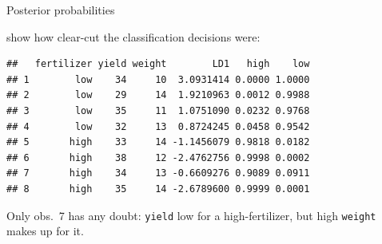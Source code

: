 \begin{frame}[fragile]{Posterior probabilities}
  
  show how clear-cut the classification decisions were:
  
\begin{knitrout}
\color{fgcolor}\begin{kframe}
\begin{alltt}
\hlkwb{=}\hlopt{$}\hlstd{)}
\hlkwb{=}\hlopt{$}
\end{alltt}
\begin{verbatim}
##   fertilizer yield weight        LD1   high    low
## 1        low    34     10  3.0931414 0.0000 1.0000
## 2        low    29     14  1.9210963 0.0012 0.9988
## 3        low    35     11  1.0751090 0.0232 0.9768
## 4        low    32     13  0.8724245 0.0458 0.9542
## 5       high    33     14 -1.1456079 0.9818 0.0182
## 6       high    38     12 -2.4762756 0.9998 0.0002
## 7       high    34     13 -0.6609276 0.9089 0.0911
## 8       high    35     14 -2.6789600 0.9999 0.0001
\end{verbatim}
\end{kframe}
\end{knitrout}
Only obs.\ 7 has any doubt: \texttt{yield} low for a high-fertilizer,
but high \texttt{weight} makes up for it.
  
\end{frame}

